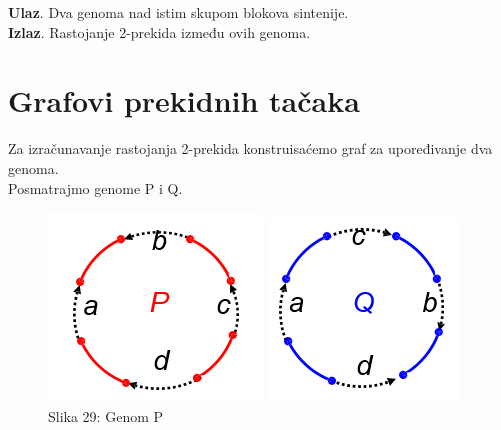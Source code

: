 \textbf{Ulaz}. Dva genoma nad istim skupom blokova
sintenije. \\

\textbf{Izlaz}. Rastojanje 2-prekida između ovih genoma.\\

\newpage
\section{Grafovi prekidnih tačaka}
\indent Za izračunavanje rastojanja 2-prekida konstruisaćemo graf za upoređivanje dva genoma.\\

Posmatrajmo genome {\color{red}P} i {\color{blue}Q}.

\begin{figure}[h!]
  \includegraphics[width=\linewidth]{poglavlja/6/slike/P.PNG}
  \caption{Slika 29: Genom P}
\endminipage\hfill
{}
  \includegraphics[width=\linewidth]{poglavlja/6/slike/Q.PNG}

\end{figure}
